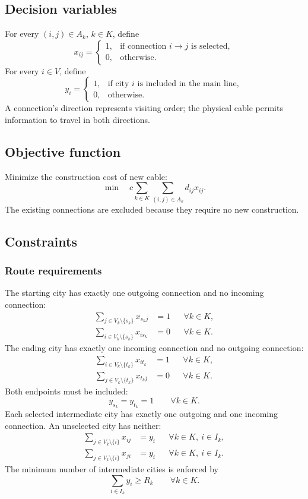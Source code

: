 \documentclass[11pt,a4paper]{article}
\begin{document}
\subsection{Decision variables}
For every $(i,j)\in A_k$, $k\in K$, define
\[
x_{ij}=\begin{cases}
1,&\text{if connection $i\rightarrow j$ is selected},\\
0,&\text{otherwise}.
\end{cases}
\]
For every $i\in V$, define
\[
y_i=\begin{cases}
1,&\text{if city $i$ is included in the main line},\\
0,&\text{otherwise}.
\end{cases}
\]
A connection's direction represents visiting order; the physical cable permits information to travel in both directions.

\subsection{Objective function}
Minimize the construction cost of new cable:
\begin{equation}
\min\quad c\sum_{k\in K}\sum_{(i,j)\in A_k}d_{ij}x_{ij}.
\label{eq:objective}
\end{equation}
The existing connections are excluded because they require no new construction.

\subsection{Constraints}
\subsubsection{Route requirements}
The starting city has exactly one outgoing connection and no incoming connection:
\begin{align}
\sum_{j\in V_k\setminus\{s_k\}}x_{s_kj}&=1 &&\forall k\in K,\\
\sum_{i\in V_k\setminus\{s_k\}}x_{is_k}&=0 &&\forall k\in K.
\end{align}
The ending city has exactly one incoming connection and no outgoing connection:
\begin{align}
\sum_{i\in V_k\setminus\{t_k\}}x_{it_k}&=1 &&\forall k\in K,\\
\sum_{j\in V_k\setminus\{t_k\}}x_{t_kj}&=0 &&\forall k\in K.
\end{align}
Both endpoints must be included:
\begin{equation}
y_{s_k}=y_{t_k}=1\qquad\forall k\in K.
\end{equation}
Each selected intermediate city has exactly one outgoing and one incoming connection. An unselected city has neither:
\begin{align}
\sum_{j\in V_k\setminus\{i\}}x_{ij}&=y_i &&\forall k\in K,\ i\in I_k,\\
\sum_{j\in V_k\setminus\{i\}}x_{ji}&=y_i &&\forall k\in K,\ i\in I_k.
\end{align}
The minimum number of intermediate cities is enforced by
\begin{equation}
\sum_{i\in I_k}y_i\ge R_k\qquad\forall k\in K.
\end{equation}
\end{document}

